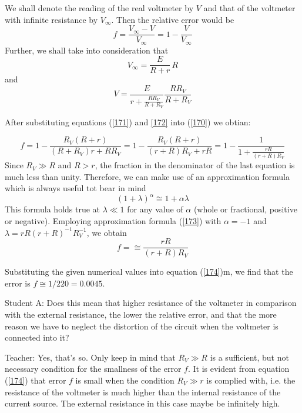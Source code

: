 \documentclass[a4paper,12pt]{book}
\begin{document}
We shall denote the reading of the real voltmeter by $V$ and that of the voltmeter with infinite resistance by $V_{\infty}$. Then the relative error would be
\begin{equation}
f  = \frac{V_{\infty} - V}{V_{\infty}} = 1 - \frac{V}{V_{\infty}} \label{170}
\end{equation}
Further, we shall take into consideration that
\begin{equation}
V_{\infty} = \frac{E}{R+r} \,R \label{171}
\end{equation}
and 
\begin{equation}
V = \frac{E}{r + \frac{RR_{V}}{R + R_{V}}}\frac{RR_{V}}{R+R_{V}} \label{172}
\end{equation}

After substituting equations (\ref{171}) and \ref{172} into (\ref{170}) we obtian:

\begin{equation*}
f = 1 - \frac{R_{V} (R + r)}{(R + R_{V})r + RR_{V}}  = 1 - \frac{R_{V} (R + r)}{(r+R)R_{V} + rR} = 1 - \frac{1}{1+ \frac{rR}{(r+R)R_{V}}} 
\end{equation*}
Since $R_{V}\gg R$ and $R> r$, the fraction in the denominator of the last equation is much less than unity. Therefore, we can make use of an approximation formula which is always useful tot bear in mind
\begin{equation}
(1+\lambda)^{\alpha} \cong 1 + \alpha \lambda \label{173}
\end{equation}
This formula holds true at $\lambda \ll 1$ for any value of $\alpha$ (whole or fractional, positive or negative). Employing approximation formula (\ref{173}) with $\alpha = -1$ and $\lambda = rR (r+R)^{-1}R_{V}^{-1}$, we obtain
\begin{equation}
f = \cong \frac{rR}{(r+R)R_{V}}
\end{equation}

Substituting the given numerical values into equation (\ref{174})m, we find that the error is $f \cong1/220 = 0.0045$.

{\sc Student A:} Does this mean that higher resistance of the voltmeter in comparison with the external resistance, the lower the relative error, and that the more reason we have to neglect the distortion of the circuit when the voltmeter is connected into it?

{\sc Teacher:} Yes, that's so. Only keep in mind that  $R_{V} \gg R$ is a sufficient, but not necessary condition for the smallness of the error $f$. It is evident from equation (\ref{174}) that error $f$ is small when the condition  $R_{V}\gg r$ is complied with, i.e. the resistance of the voltmeter is much higher than the internal resistance of the current source. The external resistance in this case maybe be infinitely high. 
\end{document}
